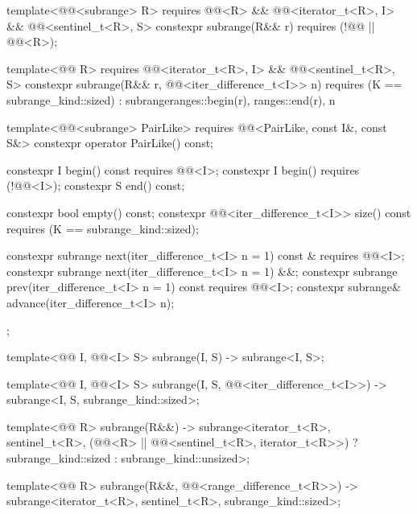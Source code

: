 \begin{codeblock}
{{    template<@@<subrange> R>
      requires @@<R> &&
               @@<iterator_t<R>, I> &&
               @@<sentinel_t<R>, S>
    constexpr subrange(R&& r) requires (!@@ || @@<R>);

    template<@@ R>
      requires @@<iterator_t<R>, I> &&
               @@<sentinel_t<R>, S>
    constexpr subrange(R&& r, @@<iter_difference_t<I>> n)
      requires (K == subrange_kind::sized)
        : subrange{ranges::begin(r), ranges::end(r), n} {}

    template<@@<subrange> PairLike>
      requires @@<PairLike, const I&, const S&>
    constexpr operator PairLike() const;

    constexpr I begin() const requires @@<I>;
    constexpr I begin() requires (!@@<I>);
    constexpr S end() const;

    constexpr bool empty() const;
    constexpr @@<iter_difference_t<I>> size() const
      requires (K == subrange_kind::sized);

    constexpr subrange next(iter_difference_t<I> n = 1) const &
      requires @@<I>;
    constexpr subrange next(iter_difference_t<I> n = 1) &&;
    constexpr subrange prev(iter_difference_t<I> n = 1) const
      requires @@<I>;
    constexpr subrange& advance(iter_difference_t<I> n);
  };

  template<@@ I, @@<I> S>
    subrange(I, S) -> subrange<I, S>;

  template<@@ I, @@<I> S>
    subrange(I, S, @@<iter_difference_t<I>>) ->
      subrange<I, S, subrange_kind::sized>;

  template<@@ R>
    subrange(R&&) ->
      subrange<iterator_t<R>, sentinel_t<R>,
               (@@<R> || @@<sentinel_t<R>, iterator_t<R>>)
                 ? subrange_kind::sized : subrange_kind::unsized>;

  template<@@ R>
    subrange(R&&, @@<range_difference_t<R>>) ->
      subrange<iterator_t<R>, sentinel_t<R>, subrange_kind::sized>;
}
\end{codeblock}

